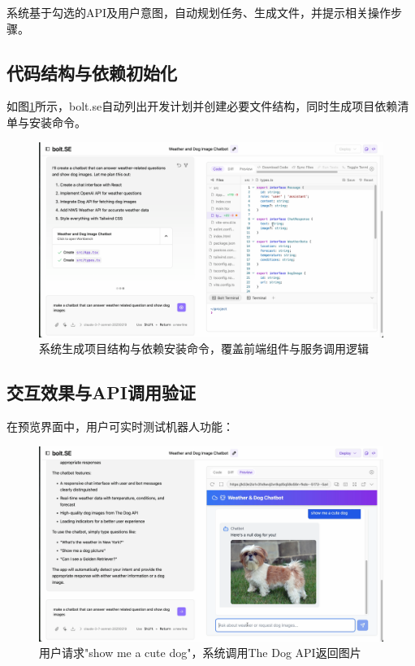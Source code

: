系统基于勾选的API及用户意图，自动规划任务、生成文件，并提示相关操作步骤。

\subsection{代码结构与依赖初始化}

如图\ref{fig:demo_plan}所示，bolt.se自动列出开发计划并创建必要文件结构，同时生成项目依赖清单与安装命令。

\begin{figure}[htbp]
  \centering
  \includegraphics[width=\textwidth]{figures/screenshots/api-actions/demo_plan_files.png}
  \caption{系统生成项目结构与依赖安装命令，覆盖前端组件与服务调用逻辑}
  \label{fig:demo_plan}
\end{figure}

\subsection{交互效果与API调用验证}

在预览界面中，用户可实时测试机器人功能：

\begin{figure}[htbp]
  \centering
  \includegraphics[width=\textwidth]{figures/screenshots/api-actions/demo_dog_preview.png}
  \caption{用户请求"show me a cute dog"，系统调用The Dog API返回图片}
  \label{fig:demo_dog}
\end{figure}


